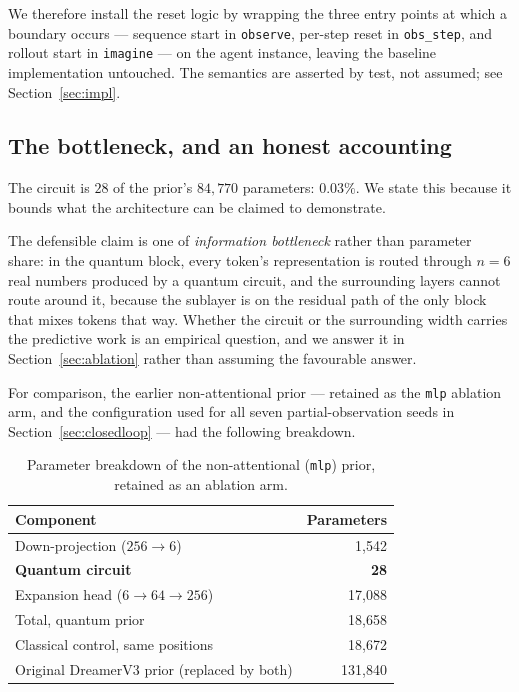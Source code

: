 \documentclass[11pt]{article}
\begin{document}
We therefore install the reset logic by wrapping the three entry points
at which a boundary occurs --- sequence start in \texttt{observe},
per-step reset in \texttt{obs\_step}, and rollout start in
\texttt{imagine} --- on the agent instance, leaving the baseline
implementation untouched. The semantics are asserted by test, not
assumed; see Section~\ref{sec:impl}.

\subsection{The bottleneck, and an honest accounting}
The circuit is $28$ of the prior's $84{,}770$ parameters: $0.03\%$. We
state this because it bounds what the architecture can be claimed to
demonstrate.

The defensible claim is one of \emph{information bottleneck} rather than
parameter share: in the quantum block, every token's representation is
routed through $n = 6$ real numbers produced by a quantum circuit, and
the surrounding layers cannot route around it, because the sublayer is
on the residual path of the only block that mixes tokens that way.
Whether the circuit or the surrounding width carries the predictive work
is an empirical question, and we answer it in
Section~\ref{sec:ablation} rather than assuming the favourable answer.

For comparison, the earlier non-attentional prior --- retained as the
\texttt{mlp} ablation arm, and the configuration used for all seven
partial-observation seeds in Section~\ref{sec:closedloop} --- had the
following breakdown.

\begin{table}[h]\centering\small
\caption{Parameter breakdown of the non-attentional (\texttt{mlp})
prior, retained as an ablation arm.}
\begin{tabular}{lr}
\toprule
Component & Parameters \\
\midrule
Down-projection ($256 \rightarrow 6$) & 1{,}542 \\
\textbf{Quantum circuit} & \textbf{28} \\
Expansion head ($6 \rightarrow 64 \rightarrow 256$) & 17{,}088 \\
\midrule
Total, quantum prior & 18{,}658 \\
Classical control, same positions & 18{,}672 \\
Original DreamerV3 prior (replaced by both) & 131{,}840 \\
\bottomrule
\end{tabular}
\end{table}
\end{document}
